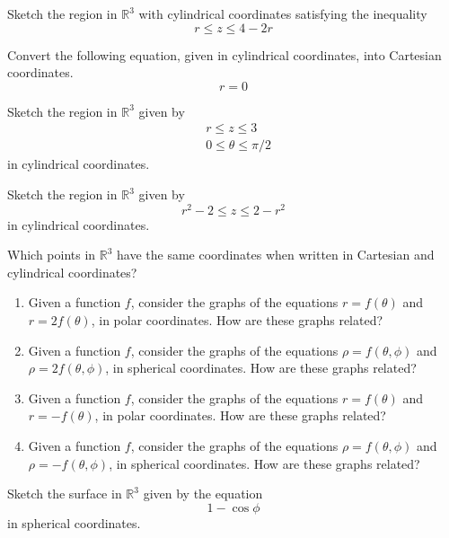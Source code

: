 \documentclass{ximera}
\begin{document}
\begin{problem}
Sketch the region in $\mathbb{R}^3$ with cylindrical coordinates satisfying the inequality
\[
r\leq z \leq 4-2r
\]
\end{problem}

\begin{problem}
Convert the following equation, given in cylindrical coordinates, into Cartesian coordinates.
\[
r = 0
\]
\end{problem}

\begin{problem}
Sketch the region in $\mathbb{R}^3$ given by
\begin{align*}
&r\leq z\leq 3\\
&0\leq\theta \leq\pi/2
\end{align*}
in cylindrical coordinates.
\end{problem}

\begin{problem}
Sketch the region in $\mathbb{R}^3$ given by
\[
r^2-2\leq z\leq 2-r^2
\]
in cylindrical coordinates.

\end{problem}

\begin{problem}
Which points in $\mathbb{R}^3$ have the same coordinates when written in Cartesian and cylindrical coordinates?
\end{problem}

\begin{problem}
\begin{enumerate}
\item Given a function $f$, consider the graphs of the equations $r = f(\theta)$ and $r = 2f(\theta)$, in polar coordinates. How are these graphs related?
\item Given a function $f$, consider the graphs of the equations $\rho = f(\theta, \phi)$ and $\rho = 2f(\theta, \phi)$, in spherical coordinates. How are these graphs related?
\item Given a function $f$, consider the graphs of the equations $r = f(\theta)$ and $r = -f(\theta)$, in polar coordinates. How are these graphs related?
\item Given a function $f$, consider the graphs of the equations $\rho = f(\theta, \phi)$ and $\rho = -f(\theta, \phi)$, in spherical coordinates. How are these graphs related?
\end{enumerate}
\end{problem}

\begin{problem}
Sketch the surface in $\mathbb{R}^3$ given by the equation
\[
1-\cos\phi
\]
in spherical coordinates.
\end{problem}
\end{document}
